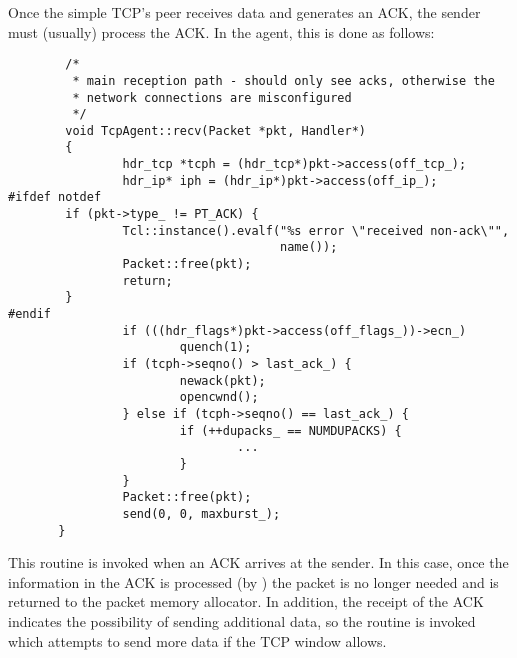Once the simple TCP's peer receives data and generates an ACK, the
sender must (usually) process the ACK.
In the  agent, this is done as follows:
\begin{small}
\begin{verbatim}
        /*
         * main reception path - should only see acks, otherwise the
         * network connections are misconfigured
         */
        void TcpAgent::recv(Packet *pkt, Handler*)
        {
                hdr_tcp *tcph = (hdr_tcp*)pkt->access(off_tcp_);
                hdr_ip* iph = (hdr_ip*)pkt->access(off_ip_);
#ifdef notdef
        if (pkt->type_ != PT_ACK) {
                Tcl::instance().evalf("%s error \"received non-ack\"",
                                      name());
                Packet::free(pkt);
                return;
        }
#endif
                if (((hdr_flags*)pkt->access(off_flags_))->ecn_)
                        quench(1);
                if (tcph->seqno() > last_ack_) {
                        newack(pkt);
                        opencwnd();
                } else if (tcph->seqno() == last_ack_) {
                        if (++dupacks_ == NUMDUPACKS) {
                                ...
                        }
                }
                Packet::free(pkt);
                send(0, 0, maxburst_);
       }
\end{verbatim}
\end{small}
This routine is invoked when an ACK arrives at the sender.
In this case, once the information in the ACK is processed (by )
the packet is no longer needed and is returned to the packet memory
allocator.
In addition, the receipt of the ACK indicates the possibility of sending
additional data, so the  routine is
invoked which attempts to send more data if the TCP window allows.

\subsubsection{}

